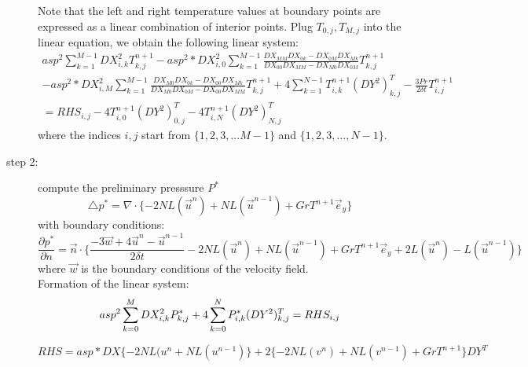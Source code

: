 \documentclass[12pt]{article}
\begin{document}
\begin{description}
Note that the left and right temperature values at boundary points are expressed as 
a linear combination of interior points. Plug $T_{0,j},T_{M,j}$ into the linear equation, 
we obtain the following linear system:\\
\begin{multline}
  asp^{2}\sum_{k=1}^{M-1}DX^{2}_{i,k}T_{k,j}^{n+1}
-asp^{2}*DX^{2}_{i,0}\sum_{k=1}^{M-1}\frac{DX_{MM}DX_{0k}-DX_{0M}DX_{Mk}}
  {DX_{00}DX_{MM}-DX_{M0}DX_{0M}} T_{k,j}^{n+1}\\
-asp^{2}*DX^{2}_{i,M}\sum_{k=1}^{M-1}\frac{DX_{M0}DX_{0k}-DX_{00}DX_{Mk}}
  {DX_{M0}DX_{0M}-DX_{00}DX_{MM}} T_{k,j}^{n+1}
  +4\sum_{k=1}^{N-1}T_{i,k}^{n+1}(DY^{2})^{T}_{k,j}
  -\frac{3Pr}{2\delta t}T_{i,j}^{n+1} \\
  =RHS_{i,j} -4T_{i,0}^{n+1}(DY^{2})^{T}_{0,j} -
  4T_{i,N}^{n+1}(DY^{2})^{T}_{N,j}
\end{multline}
where the indices $i,j$ start from $\{1,2,3,...M-1\}$ and
$\{1,2,3,...,N-1\}$.

\item[step 2:] compute the preliminary presssure $P^{*}$\\
\begin{equation}
\triangle {p}^{*} = \nabla \cdot  \{-2NL(\vec{u}^{n}) + NL(\vec{u}^{n-1}) + GrT^{n+1}\vec{e}_{y} \}
\end{equation}
 with boundary conditions:\\
\begin{equation}
\frac{\partial {p}^{*}}{\partial{n}}= \vec{n} \cdot \{\frac{-3\vec{w}+4\vec{u}^{n}-\vec{u}^{n-1}}{2\delta t}
      -2NL(\vec{u}^{n}) + NL(\vec{u}^{n-1}) + GrT^{n+1}\vec{e}_{y} + 2L(\vec{u}^{n})-L(\vec{u}^{n-1}) \}
\end{equation}
where $\vec{w}$ is the boundary conditions of the velocity field.\\
Formation of the linear system:
\begin{equation}
asp^{2}\sum_{k=0}^{M}DX^{2}_{i,k}P^{*}_{k,j} + 4\sum_{k=0}^{N}P^{*}_{i,k}(DY^{2})^{T}_{k,j}
= RHS_{i,j}\\
\end{equation}

\begin{equation}
RHS = asp*DX\{-2NL(u^{n}+NL(u^{n-1}) \}
+2\{-2NL(v^{n})+NL(v^{n-1})+GrT^{n+1} \} DY^{T}
\end{equation}


\end{description}
\end{document}
